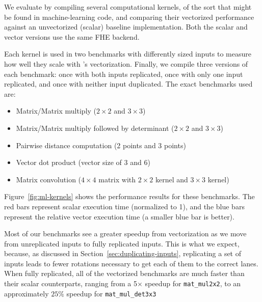 We evaluate \system by compiling several computational kernels, of the sort that might be found in machine-learning code, and comparing their vectorized performance against an unvectorized (scalar) baseline implementation. Both the scalar and vector versions use the same FHE backend.

Each kernel is used in two benchmarks with differently sized inputs to measure how well they scale with \system's vectorization.
Finally, we compile three versions of each benchmark: once with both inputs replicated, once with only one input replicated, and once with neither input duplicated. 
The exact benchmarks used are:
\begin{itemize}
    \item Matrix/Matrix multiply ($2 \times 2$ and $3 \times 3$)
    \item Matrix/Matrix multiply followed by determinant ($2 \times 2$ and $3 \times 3$)
    \item Pairwise distance computation (2 points and 3 points)
    \item Vector dot product (vector size of 3 and 6)
    \item Matrix convolution ($4 \times 4$ matrix with $2 \times 2$ kernel and $3 \times 3$ kernel)
\end{itemize}

Figure~\ref{fig:ml-kernels} shows the performance results for these benchmarks.
The red bars represent scalar execution time (normalized to 1), and the blue bars represent the relative vector execution time (a smaller blue bar is better).

Most of our benchmarks see a greater speedup from vectorization as we move from unreplicated inputs to fully replicated inputs.
This is what we expect, because, as discussed in Section~\ref{sec:duplicating-inputs}, replicating a set of inputs leads to fewer rotations necessary to get each of them to the correct lanes.
When fully replicated, all of the vectorized benchmarks are much faster than their scalar counterparts, ranging from a 5$\times$ speedup for \texttt{mat\_mul2x2}, to an approximately $25\%$ speedup for \texttt{mat\_mul\_det3x3}

